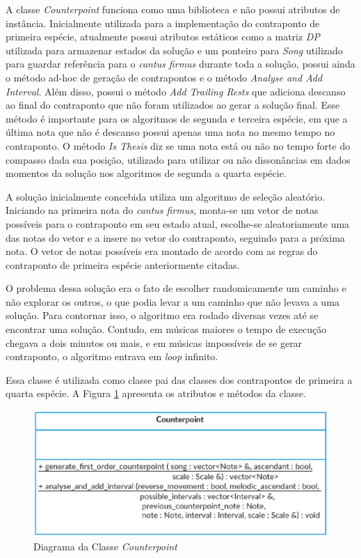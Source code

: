     A classe \textit{Counterpoint} funciona como uma biblioteca e não possui atributos de instância. Inicialmente utilizada para a implementação do contraponto de primeira espécie, atualmente possui atributos estáticos como a matriz \textit{DP} utilizada para armazenar estados da solução e um ponteiro para \textit{Song} utilizado para guardar referência para o \textit{cantus firmus} durante toda a solução, possui ainda o método ad-hoc de geração de contrapontos e o método \textit{Analyse and Add Interval}. Além disso, possui o método \textit{Add Trailing Rests} que adiciona descanso ao final do contraponto que não foram utilizados ao gerar a solução final. Esse método é importante para os algoritmos de segunda e terceira espécie, em que a última nota que não é descanso possui apenas uma nota no mesmo tempo no contraponto. O método \textit{Is Thesis} diz se uma nota está ou não no tempo forte do compasso dada sua posição, utilizado para utilizar ou não dissonâncias em dados momentos da solução nos algoritmos de segunda a quarta espécie.

    A solução inicialmente concebida utiliza um algoritmo de seleção aleatório. Iniciando na primeira nota do \textit{cantus firmus}, monta-se um vetor de notas possíveis para o contraponto em seu estado atual, escolhe-se aleatoriamente uma das notas do vetor e a insere no vetor do contraponto, seguindo para a próxima nota. O vetor de notas possíveis era montado de acordo com as regras do contraponto de primeira espécie anteriormente citadas.

    O problema dessa solução era o fato de escolher randomicamente um caminho e não explorar os outros, o que podia levar a um caminho que não levava a uma solução. Para contornar isso, o algoritmo era rodado diversas vezes até se encontrar uma solução. Contudo, em músicas maiores o tempo de execução chegava a dois minutos ou mais, e em músicas impossíveis de se gerar contraponto, o algoritmo entrava em \textit{loop} infinito.

    Essa classe é utilizada como classe pai das classes dos contrapontos de primeira a quarta espécie. A Figura \ref{counterpointclass} apresenta os atributos e métodos da classe.

    \begin{figure}[htb]
      \centering
      \includegraphics[scale=0.7]{figuras/counterpointclass.eps}
      \caption{Diagrama da Classe \textit{Counterpoint}}
      \label{counterpointclass}
    \end{figure}


